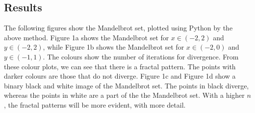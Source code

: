 \documentclass{article}
\begin{document}
\subsection{Results}

The following figures show the Mandelbrot set, plotted using Python by the above method. Figure 1a shows the Mandelbrot set for $x \in (-2,2)$ and $y \in (-2,2)$, while Figure 1b shows the Mandelbrot set for $x \in (-2,0)$ and $y \in (-1,1)$. The colours show the number of iterations for divergence. From these colour plots, we can see that there is a fractal pattern. The points with darker colours are those that do not diverge. Figure 1c and Figure 1d show a binary black and white image of the Mandelbrot set. The points in black diverge, whereas the points in white are a part of the the Mandelbrot set. With a higher $n$, the fractal patterns will be more evident, with more detail.
\end{document}
